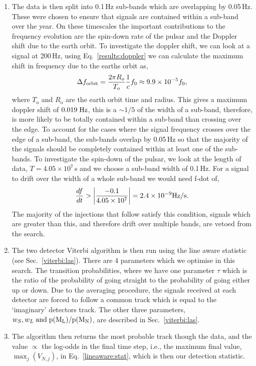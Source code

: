 \begin{enumerate}
\item The data is then split into 0.1\,Hz sub-bands which are overlapping by 0.05\,Hz. These were chosen to ensure that signals are contained within a sub-band over the year. On these timescales the important contributions to the frequency evolution are the spin-down rate of the pulsar and the Doppler shift due to the earth orbit.
To investigate the doppler shift, we can look at a signal at 200\,Hz, using Eq.~\ref{results:doppler} we can calculate the maximum shift in frequency due to the earths orbit as,
%
\begin{equation}
\Delta f_{\rm orbit} = \frac{2 \pi R_o}{T_o} \frac{1}{c} f_0 \approx 9.9 \times 10^{-5} f_0,
\end{equation}
%
where $T_{\text{o}}$ and $R_{\text{o}}$ are the
earth orbit time and radius. This gives a maximum doppler shift of $0.019 \; \rm{Hz}$, this is a $\sim 1/5$ of the width of a sub-band, therefore, is more likely to be totally contained within a sub-band than crossing over the edge.
To account for the cases where the signal frequency crosses over the edge of a sub-band, the sub-bands overlap by 0.05\,Hz so that the majority of the signals should be completely contained within at least one of the sub-bands.
To investigate the spin-down of the pulsar, we look at the length of data, $T=4.05 \times 10^7$\,s and we choose a sub-band width of 0.1\,Hz. For a signal to drift over the width of a whole sub-band we would need f-dot of,
\begin{equation}
\frac{df}{dt} > \left|\frac{-0.1}{4.05 \times 10^7}\right| = 2.4 \times 10^{-9} \rm{Hz/s}.
\end{equation}
The majority of the injections that follow satisfy this condition, signals which are greater than this, and therefore drift over multiple bands, are vetoed from the search.
%
\item The two detector Viterbi algorithm is then run using the line aware
statistic (see Sec.~\ref{viterbi:las}). There are 4 parameters which we optimise in this search. The transition probabilities, where we have one parameter $\tau$ which is the ratio of the probability
of going straight to the probability of going either up or down. Due to the averaging
procedure, the signals received at each detector are forced to follow a common track which is equal to the `imaginary' detectors track. The other three parameters, $w_S, w_L \; \rm{and} \; p(M_L)/p(M_N)$, are described in Sec.~\ref{viterbi:las}.
%
\item The algorithm then returns the most probable track though the data, and the value
$\propto$ the log-odds in the final time step, i.e., the
maximum final value, $\max_j(V_{N,j})$, in Eq.~\ref{lineaware:stat}, which is then our detection statistic.

%
\end{enumerate}
